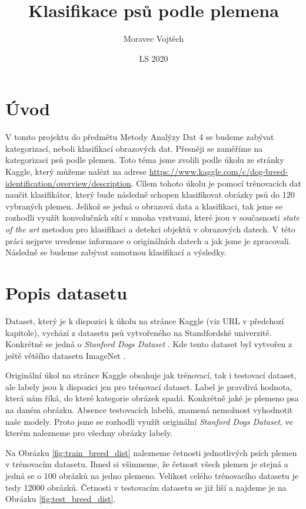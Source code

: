 \documentclass[a4paper,12pt]{article}
\author{Moravec Vojtěch}
\title{Klasifikace psů podle plemena}
\date{LS 2020}
\begin{document}
\maketitle
\newpage

\section{Úvod}
V tomto projektu do předmětu Metody Analýzy Dat 4 se budeme zabývat kategorizací, neboli klasifikací obrazových dat.
Přesněji se zaměříme na kategorizaci psů podle plemen. Toto téma jsme zvolili podle úkolu ze stránky Kaggle, 
který můžeme nalézt na adrese \linebreak \url{https://www.kaggle.com/c/dog-breed-identification/overview/description}. 
Cílem tohoto úkolu je pomocí trénovacích dat naučit klasifikátor, který bude následně schopen klasifikovat obrázky psů do 120 vybraných plemen.
Jelikož se jedná o obrazová data a klasifikaci, tak jsme se rozhodli využít konvolučních sítí s mnoha vrstvami, které jsou v současnosti
\emph{state of the art} metodou pro klasifikaci a detekci objektů v obrazových datech. V této práci nejprve uvedeme informace o originálních
datech a jak jsme je zpracovali. Následně se budeme zabývat samotnou klasifikací a výsledky.

\section{Popis datasetu}
Dataset, který je k dispozici k úkolu na stránce Kaggle (viz URL v předchozí kapitole), vychází z datasetu psů vytvořeného na Standfordské univerzitě.
Konkrétně se jedná o \emph{Stanford Dogs Dataset} \cite{KhoslaYaoJayadevaprakashFeiFei_FGVC2011}. Kde tento dataset byl vytvořen z ještě většího datasetu ImageNet \cite{imagenet_cvpr09}.

Originální úkol na stránce Kaggle obsahuje jak trénovací, tak i testovací dataset, ale labely jsou k dispozici jen pro trénovací dataset. Label je pravdivá hodnota, která nám říká, do které kategorie obrázek spadá. Konkrétně jaké je plemeno psa na daném obrázku. Absence testovacích labelů, znamená nemožnost vyhodnotit naše modely. Proto jsme se rozhodli využít originální \emph{Stanford Dogs Dataset}, ve kterém nalezneme pro všechny obrázky labely.

Na Obrázku \ref{fig:train_breed_dist} nalezneme četnosti jednotlivých psích plemen v trénovacím datasetu. Ihned si všimneme, že četnost všech plemen je stejná
a jedná se o 100 obrázků na jedno plemeno. Velikost celého trénovacího datasetu je tedy 12000 obrázků. Četnosti v testovacím datasetu se již liší a najdeme je na Obrázku \ref{fig:test_breed_dist}.
\end{document}
